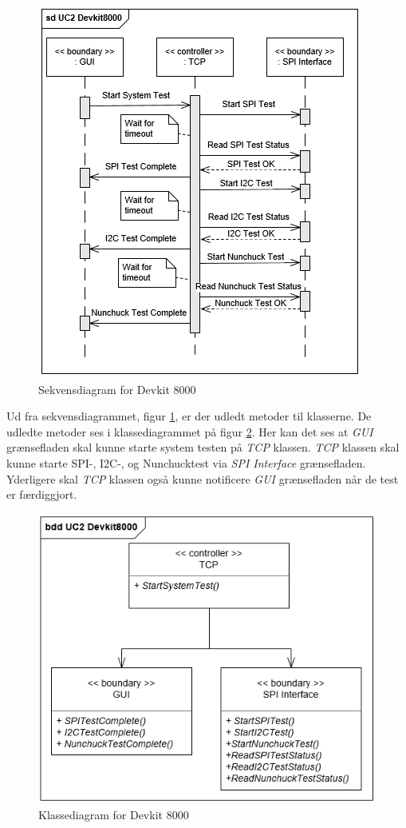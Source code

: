 \begin{figure}[H]
	\centering
	\includegraphics[]{Systemarkitektur/images/DevKit8000SequenceDiagram.png}
	\caption{Sekvensdiagram for Devkit 8000}
	\label{fig:sekvensDevkit}
\end{figure}

Ud fra sekvensdiagrammet, figur \ref{fig:sekvensDevkit}, er der udledt metoder til klasserne. De udledte metoder ses i klassediagrammet på figur \ref{fig:klasseDevkit}. Her kan det ses at \textit{GUI} grænsefladen skal kunne starte system testen på \textit{TCP} klassen. \textit{TCP} klassen skal kunne starte SPI-, I2C-, og Nunchucktest via \textit{SPI Interface} grænsefladen. Yderligere skal \textit{TCP} klassen også kunne notificere \textit{GUI} grænsefladen når de test er færdiggjort.

\begin{figure}[H]
	\centering
	\includegraphics[] {Systemarkitektur/images/DevKit8000ClassDiagram}
	\caption{Klassediagram for Devkit 8000}
	\label{fig:klasseDevkit}
\end{figure}

